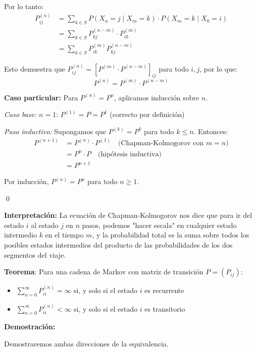 \documentclass[12pt,a4paper]{article}
\newcommand{\teorema}[1]{%
\begin{teoremabox}
\textbf{Teorema}: #1
\end{teoremabox}
}
\begin{document}
Por lo tanto:
\begin{align*}
P_{ij}^{(n)} &= \sum_{k \in S} P(X_n = j \mid X_m = k) \cdot P(X_m = k \mid X_0 = i) \\
&= \sum_{k \in S} P_{kj}^{(n-m)} \cdot P_{ik}^{(m)} \\
&= \sum_{k \in S} P_{ik}^{(m)} P_{kj}^{(n-m)}
\end{align*}

Esto demuestra que $P_{ij}^{(n)} = [P^{(m)} \cdot P^{(n-m)}]_{ij}$ para todo $i,j$, por lo que:
\begin{equation*}
P^{(n)} = P^{(m)} \cdot P^{(n-m)}
\end{equation*}

\textbf{Caso particular:} Para $P^{(n)} = P^n$, aplicamos inducción sobre $n$.

\textit{Caso base:} $n = 1$: $P^{(1)} = P = P^1$ (correcto por definición)

\textit{Paso inductivo:} Supongamos que $P^{(k)} = P^k$ para todo $k \leq n$. Entonces:
\begin{align*}
P^{(n+1)} &= P^{(n)} \cdot P^{(1)} \quad \text{(Chapman-Kolmogorov con } m = n\text{)} \\
&= P^n \cdot P \quad \text{(hipótesis inductiva)} \\
&= P^{n+1}
\end{align*}

Por inducción, $P^{(n)} = P^n$ para todo $n \geq 1$.

\qed

\textbf{Interpretación:} La ecuación de Chapman-Kolmogorov nos dice que para ir del estado $i$ al estado $j$ en $n$ pasos, podemos "hacer escala" en cualquier estado intermedio $k$ en el tiempo $m$, y la probabilidad total es la suma sobre todos los posibles estados intermedios del producto de las probabilidades de los dos segmentos del viaje.


\teorema{Para una cadena de Markov con matriz de transición $P = (P_{ij})$:
\begin{itemize}
    \item $\sum_{n=0}^{\infty} P_{ii}^{(n)} = \infty$ si, y solo si el estado $i$ es recurrente
    \item $\sum_{n=0}^{\infty} P_{ii}^{(n)} < \infty$ si, y solo si el estado $i$ es transitorio
\end{itemize}}

\textbf{Demostración:}

Demostraremos ambas direcciones de la equivalencia.
\end{document}
